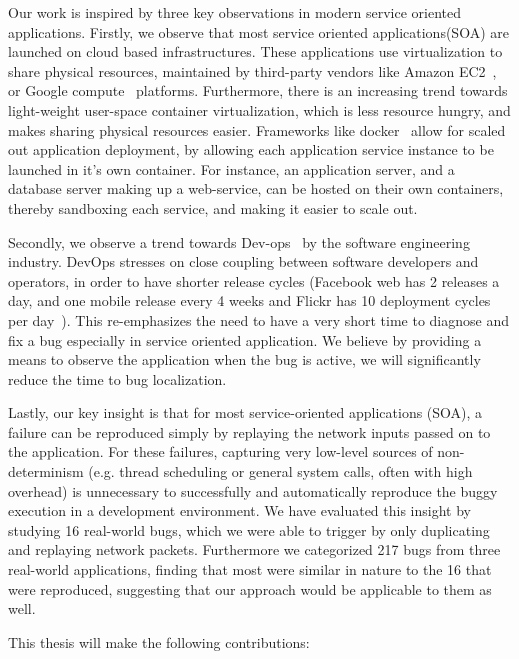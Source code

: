 Our work is inspired by three key observations in modern service oriented applications.
Firstly, we observe that most service oriented applications(SOA) are launched on cloud based infrastructures.
These applications use virtualization to share physical resources, maintained by third-party vendors like Amazon EC2~\cite{ec2}, or Google compute~\cite{gcompute} platforms.
Furthermore, there is an increasing trend towards light-weight user-space container virtualization, which is less resource hungry, and makes sharing physical resources easier.
Frameworks like docker~\cite{docker} allow for scaled out application deployment, by allowing each application service instance to be launched in it's own container.
For instance, an application server, and a database server making up a web-service, can be hosted on their own containers, thereby sandboxing each service, and making it easier to scale out.

Secondly, we observe a trend towards Dev-ops~\cite{devops} by the software engineering industry.
DevOps stresses on close coupling between software developers and operators, in order to have shorter release cycles (Facebook web has 2 releases a day, and one mobile release every 4 weeks and Flickr has 10 deployment cycles per day~\cite{releaseFacebookKeynote,10DevOps}).
This re-emphasizes the need to have a very short time to diagnose and fix a bug especially in service oriented application.
We believe by providing a means to observe the application when the bug is active, we will significantly reduce the time to bug localization.

Lastly, our key insight is that for most service-oriented applications (SOA), a failure can be reproduced simply by replaying the network inputs passed on to the application.
For these failures, capturing very low-level sources of non-determinism (e.g. thread scheduling or general system calls, often with high overhead) is unnecessary to successfully and automatically reproduce the buggy execution in a development environment. 
We have evaluated this insight by studying 16 real-world bugs, which we were able to trigger by only duplicating and replaying network packets.
Furthermore we categorized 217 bugs from three real-world applications, finding that most were similar in nature to the 16 that were reproduced, suggesting that our approach would be applicable to them as well.

\noindent This thesis will make the following contributions:

